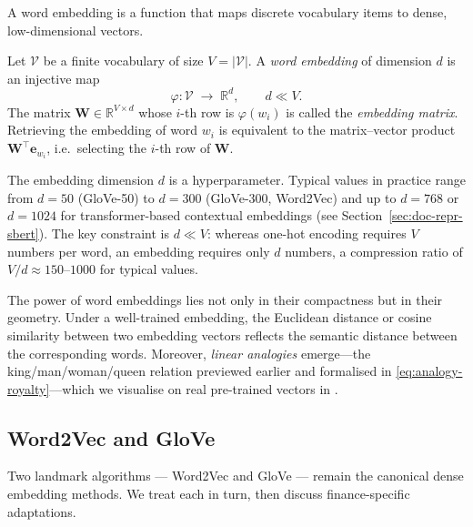 \begin{deepdive}
A word embedding is a function that maps discrete vocabulary items to
dense, low-dimensional vectors.

\begin{definition}
\label{def:word-embedding}
Let $\mathcal{V}$ be a finite vocabulary of size $V = |\mathcal{V}|$.
A \emph{word embedding} of dimension $d$ is an injective map
\begin{equation}
  \varphi : \mathcal{V} \;\longrightarrow\; \mathbb{R}^{d},
  \qquad d \ll V.
  \label{eq:embedding-map}
\end{equation}
The matrix $\mathbf{W} \in \mathbb{R}^{V \times d}$ whose $i$-th row is
$\varphi(w_i)$ is called the \emph{embedding matrix}.  Retrieving the
embedding of word $w_i$ is equivalent to the matrix--vector product
$\mathbf{W}^\top \mathbf{e}_{w_i}$, i.e.\ selecting the $i$-th row of
$\mathbf{W}$.
\end{definition}

The embedding dimension $d$ is a hyperparameter.  Typical values in
practice range from $d = 50$ (GloVe-50) to $d = 300$ (GloVe-300,
Word2Vec) and up to $d = 768$ or $d = 1024$ for transformer-based
contextual embeddings (see Section~\ref{sec:doc-repr-sbert}).  The key
constraint is $d \ll V$: whereas one-hot encoding requires $V$ numbers
per word, an embedding requires only $d$ numbers, a compression ratio
of $V/d \approx 150$--$1000$ for typical values.

\begin{remark}
\label{rem:embedding-geometry}
The power of word embeddings lies not only in their compactness but in
their geometry.  Under a well-trained embedding, the Euclidean distance
or cosine similarity between two embedding vectors reflects the semantic
distance between the corresponding words.  Moreover, \emph{linear
analogies} emerge---the king/man/woman/queen relation previewed earlier and formalised
in \eqref{eq:analogy-royalty}---which we visualise on real pre-trained vectors in
.
\end{remark}

\subsection{Word2Vec and GloVe}
\label{sec:embeddings-word2vec}

Two landmark algorithms — Word2Vec \cite{mikolov2013efficient} %
and GloVe \cite{pennington2014glove} %
— remain the canonical dense embedding methods.  We treat each in turn,
then discuss finance-specific adaptations.


\end{deepdive}
